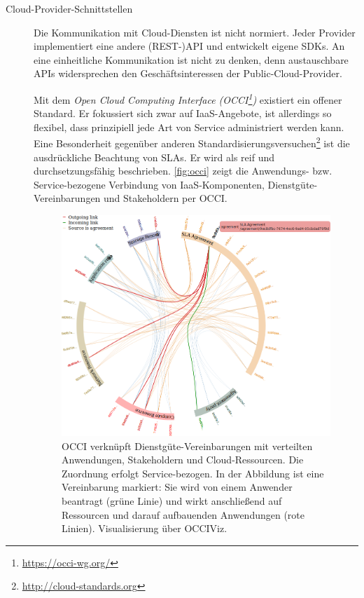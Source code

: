 \begin{description}
	

	
	\item[Cloud-Provider-Schnittstellen] Die Kommunikation mit Cloud-Diensten ist nicht normiert. Jeder Provider implementiert eine andere (REST-)API und entwickelt eigene SDKs. An eine einheitliche Kommunikation ist nicht zu denken, denn austauschbare APIs widersprechen den Geschäftsinteressen der Public-Cloud-Provider.
	
	Mit dem \emph{Open Cloud Computing Interface (OCCI\footnote{\url{https://occi-wg.org/}})} existiert ein offener Standard. Er fokussiert sich zwar auf IaaS-Angebote, ist allerdings so flexibel, dass prinzipiell jede Art von Service administriert werden kann. Eine Besonderheit gegenüber anderen Standardisierungsversuchen\footnote{\url{http://cloud-standards.org}} ist die ausdrückliche Beachtung von SLAs. Er wird als reif und durchsetzungsfähig beschrieben. 
	\autoref{fig:occi} zeigt die Anwendungs- bzw. Service-bezogene Verbindung von IaaS-Komponenten, Dienstgüte-Vereinbarungen und Stakeholdern per OCCI.
	
	\begin{figure}[]
		\centering
		\includegraphics[width=\textwidth]{images/OCCI-relations.png}
		\caption{OCCI verknüpft Dienstgüte-Vereinbarungen mit verteilten Anwendungen, Stakeholdern und Cloud-Ressourcen. Die Zuordnung erfolgt Service-bezogen. In der Abbildung ist eine Vereinbarung markiert: Sie wird von einem Anwender beantragt (grüne Linie) und wirkt anschließend auf Ressourcen und darauf aufbauenden Anwendungen (rote Linien). Visualisierung über OCCIViz.}
		\label{fig:occi}
	\end{figure}
	

\end{description}
